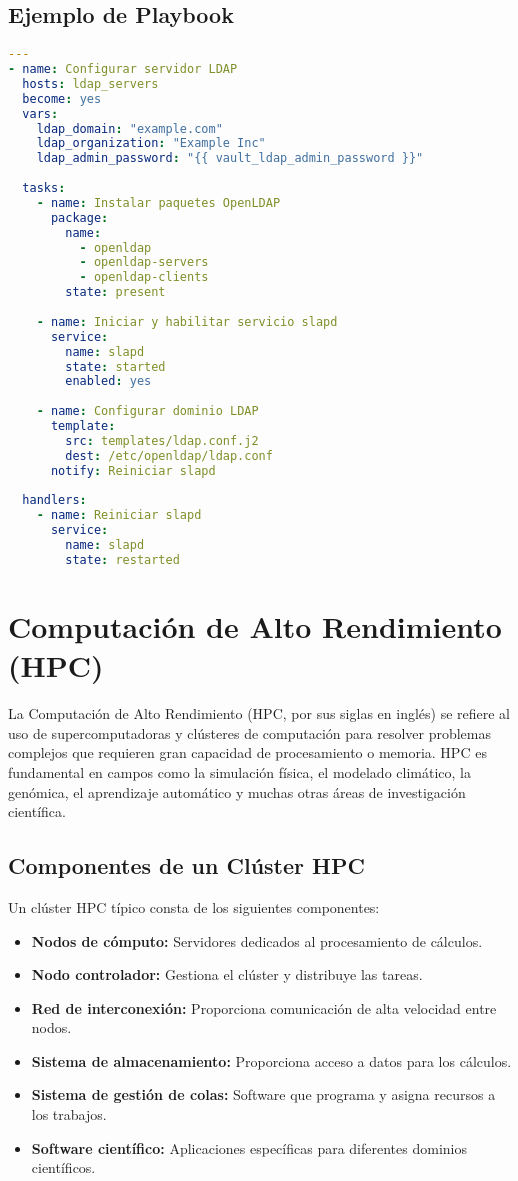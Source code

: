 \documentclass[12pt,a4paper]{report}
\begin{document}
\subsection{Ejemplo de Playbook}

\begin{lstlisting}[language=yaml]
---
- name: Configurar servidor LDAP
  hosts: ldap_servers
  become: yes
  vars:
    ldap_domain: "example.com"
    ldap_organization: "Example Inc"
    ldap_admin_password: "{{ vault_ldap_admin_password }}"
  
  tasks:
    - name: Instalar paquetes OpenLDAP
      package:
        name:
          - openldap
          - openldap-servers
          - openldap-clients
        state: present
    
    - name: Iniciar y habilitar servicio slapd
      service:
        name: slapd
        state: started
        enabled: yes
    
    - name: Configurar dominio LDAP
      template:
        src: templates/ldap.conf.j2
        dest: /etc/openldap/ldap.conf
      notify: Reiniciar slapd
  
  handlers:
    - name: Reiniciar slapd
      service:
        name: slapd
        state: restarted
\end{lstlisting}

\section{Computación de Alto Rendimiento (HPC)}

La Computación de Alto Rendimiento (HPC, por sus siglas en inglés) se refiere al uso de supercomputadoras y clústeres de computación para resolver problemas complejos que requieren gran capacidad de procesamiento o memoria. HPC es fundamental en campos como la simulación física, el modelado climático, la genómica, el aprendizaje automático y muchas otras áreas de investigación científica.

\subsection{Componentes de un Clúster HPC}

Un clúster HPC típico consta de los siguientes componentes:

\begin{itemize}
    \item \textbf{Nodos de cómputo:} Servidores dedicados al procesamiento de cálculos.
    \item \textbf{Nodo controlador:} Gestiona el clúster y distribuye las tareas.
    \item \textbf{Red de interconexión:} Proporciona comunicación de alta velocidad entre nodos.
    \item \textbf{Sistema de almacenamiento:} Proporciona acceso a datos para los cálculos.
    \item \textbf{Sistema de gestión de colas:} Software que programa y asigna recursos a los trabajos.
    \item \textbf{Software científico:} Aplicaciones específicas para diferentes dominios científicos.
\end{itemize}
\end{document}
